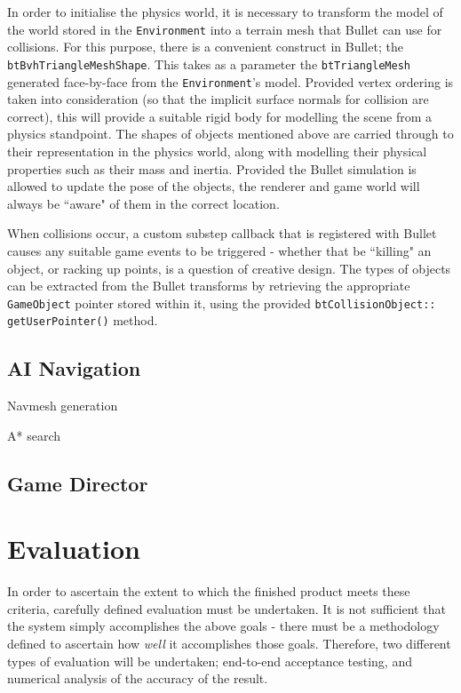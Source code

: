 \documentclass[a4paper,10pt]{article}
\begin{document}
In order to initialise the physics world, it is necessary to transform the model of the world stored in the \texttt{Environment} into a terrain mesh that Bullet can use for collisions. For this purpose, there is a convenient construct in Bullet; the \texttt{btBvhTriangleMeshShape}. This takes as a parameter the \texttt{btTriangleMesh} generated face-by-face from the \texttt{Environment}'s model. Provided vertex ordering is taken into consideration (so that the implicit surface normals for collision are correct), this will provide a suitable rigid body for modelling the scene from a physics standpoint. The shapes of objects mentioned above are carried through to their representation in the physics world, along with modelling their physical properties such as their mass and inertia. Provided the Bullet simulation is allowed to update the pose of the objects, the renderer and game world will always be ``aware" of them in the correct location.

When collisions occur, a custom substep callback that is registered with Bullet causes any suitable game events to be triggered - whether that be ``killing" an object, or racking up points, is a question of creative design. The types of objects can be extracted from the Bullet transforms by retrieving the appropriate \texttt{GameObject} pointer stored within it, using the provided \texttt{btCollisionObject:: getUserPointer()} method.

\subsection{AI Navigation}
Navmesh generation

A* search

\subsection{Game Director}

\section{Evaluation}
In order to ascertain the extent to which the finished product meets these criteria, carefully defined evaluation must be undertaken. It is not sufficient that the system simply accomplishes the above goals - there must be a methodology defined to ascertain how \textit{well} it accomplishes those goals. Therefore, two different types of evaluation will be undertaken; end-to-end acceptance testing, and numerical analysis of the accuracy of the result.
\end{document}

